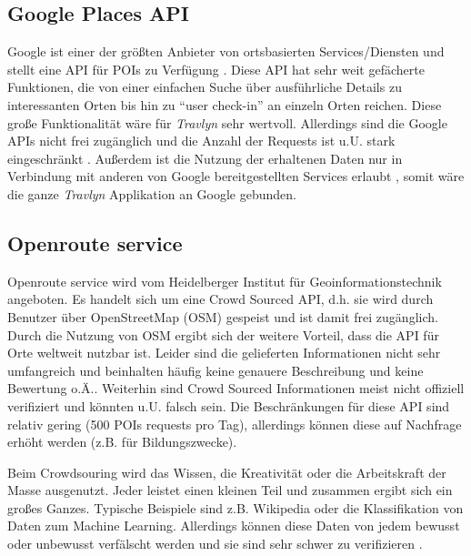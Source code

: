 \subsection{Google Places API}
Google ist einer der größten Anbieter von ortsbasierten Services/Diensten und stellt eine API für POIs zu Verfügung \cite{Google.01.02.2020}. Diese API hat sehr weit gefächerte Funktionen, die von einer einfachen Suche über ausführliche Details zu interessanten Orten bis hin zu \enquote{user check-in} an einzeln Orten reichen. Diese große Funktionalität wäre für \textit{Travlyn} sehr wertvoll. Allerdings sind die Google APIs nicht frei zugänglich und die Anzahl der Requests ist u.U. stark eingeschränkt \cite{Singhal.2012}. Außerdem ist die Nutzung der erhaltenen Daten nur in Verbindung mit anderen von Google bereitgestellten Services erlaubt \cite{Google.02.12.2019}, somit wäre die ganze \textit{Travlyn} Applikation an Google gebunden.  

\subsection{Openroute service} \label{sec:openRouteService}
Openroute service \cite{TheHeidelbergInstituteforGeoinformationTechnology.} wird vom Heidelberger Institut für Geoinformationstechnik angeboten. Es handelt sich um eine Crowd Sourced API, d.h. sie wird durch Benutzer über OpenStreetMap (OSM) \cite{OpenStreetMap.} gespeist und ist damit frei zugänglich. Durch die Nutzung von OSM ergibt sich der weitere Vorteil, dass die API für Orte weltweit nutzbar ist. Leider sind die gelieferten Informationen nicht sehr umfangreich und beinhalten häufig keine genauere Beschreibung und keine Bewertung o.Ä.. Weiterhin sind Crowd Sourced Informationen meist nicht offiziell verifiziert und könnten u.U. falsch sein. Die Beschränkungen für diese API sind relativ gering (500 POIs requests pro Tag), allerdings können diese auf Nachfrage erhöht werden (z.B. für Bildungszwecke).

\begin{defStrich}[Crowdsourcing]
	Beim Crowdsouring wird das Wissen, die Kreativität oder die Arbeitskraft der Masse ausgenutzt. Jeder leistet einen kleinen Teil und zusammen ergibt sich ein großes Ganzes. Typische Beispiele sind z.B. Wikipedia oder die Klassifikation von Daten zum Machine Learning. Allerdings können diese Daten von jedem bewusst oder unbewusst verfälscht werden und sie sind sehr schwer zu verifizieren \cite{Winkler.2009}. 
\end{defStrich}

